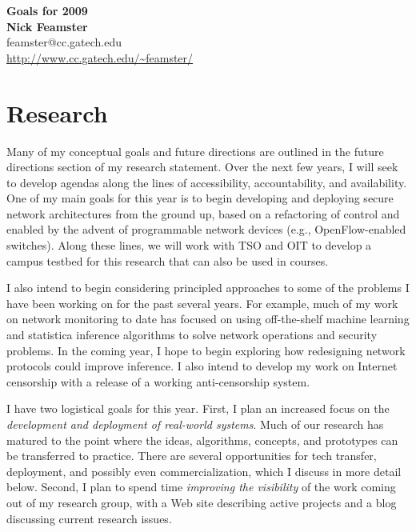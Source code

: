 \begin{sloppypar}

\newpage
\begin{center}
{\Large\textbf{Goals for 2009}}\\[.1in]
{\large\textbf{Nick Feamster}}\\[.05in]
feamster@cc.gatech.edu \\
\url{http://www.cc.gatech.edu/~feamster/} \\[.1in]
\end{center}

\section*{Research}

Many of my conceptual goals and future directions are outlined in the
future directions section of my research statement.  Over the next few
years, I will seek to develop agendas along the lines of accessibility,
accountability, and availability.  One of my main goals for this year is
to begin developing and deploying secure network architectures from the
ground up, based on a refactoring of control and enabled by the advent
of programmable network devices (e.g., OpenFlow-enabled switches).
Along these lines, we will work with TSO and OIT to develop a campus
testbed for this research that can also be used in courses.

I also intend to begin considering principled approaches to some of the
problems I have been working on for the past several years.  For
example, much of my work on network monitoring to date has focused on
using off-the-shelf machine learning and statistica inference algorithms
to solve network operations and security problems.  In the coming year,
I hope to begin exploring how redesigning network protocols could
improve inference.  I also intend to develop my work on Internet
censorship with a release of a working anti-censorship system.


I have two logistical goals for this year.  First, I plan an increased
focus on the {\em development and deployment of real-world systems}.
Much of our research has matured to the point where the ideas,
algorithms, concepts, and prototypes can be transferred to practice.
There are several opportunities for tech transfer, deployment, and
possibly even commercialization, which I discuss in more detail
below. Second, I plan to spend time {\em improving the visibility} of
the work coming out of my research group, with a Web site describing
active projects and a blog discussing current research issues.


\end{sloppypar}
